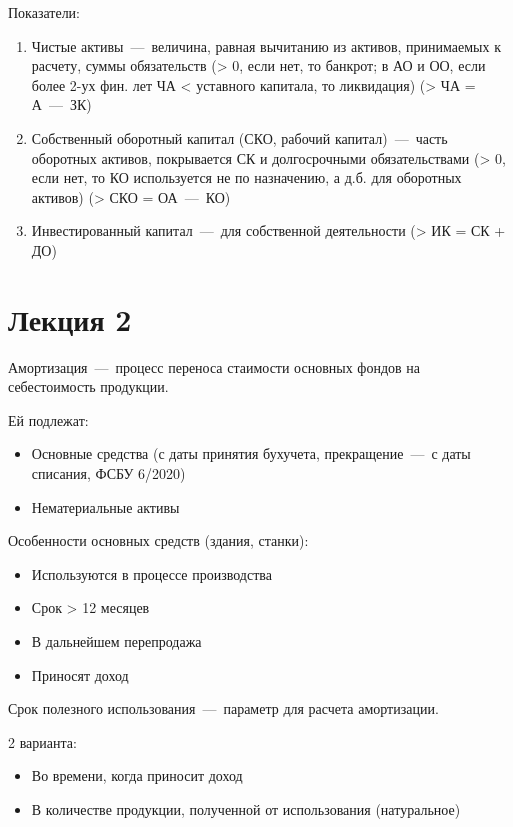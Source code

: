\documentclass[14pt]{extarticle}
\begin{document}
Показатели:

\begin{enumerate}
	\item Чистые активы~---~величина, равная вычитанию из активов, принимаемых к расчету, суммы обязательств (> 0, если нет, то банкрот; в АО и ОО, если более 2-ух фин. лет ЧА < уставного капитала, то ликвидация) (> ЧА = А~---~ЗК)
	\item Собственный оборотный капитал (СКО, рабочий капитал)~---~часть оборотных активов, покрывается СК и долгосрочными обязательствами (> 0, если нет, то КО используется не по назначению, а д.б. для оборотных активов) (> СКО = ОА~---~КО)
	\item Инвестированный капитал~---~для собственной деятельности (> ИК = СК + ДО)
\end{enumerate}

\section{Лекция 2}

Амортизация~---~процесс переноса стаимости основных фондов на себестоимость продукции.

Ей подлежат:

\begin{itemize}
	\item Основные средства (с даты принятия бухучета, прекращение~---~с даты списания, ФСБУ 6/2020)
	\item Нематериальные активы
\end{itemize}

Особенности основных средств (здания, станки):

\begin{itemize}
	\item Используются в процессе производства
	\item Срок > 12 месяцев
	\item В дальнейшем перепродажа
	\item Приносят доход
\end{itemize}

Срок полезного использования~---~параметр для расчета амортизации.

2 варианта:

\begin{itemize}
	\item Во времени, когда приносит доход
	\item В количестве продукции, полученной от использования (натуральное)
\end{itemize}
\end{document}
